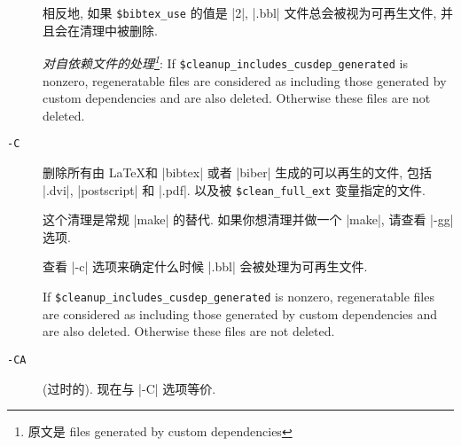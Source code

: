 \documentclass{ctexart}
\begin{document}
\begin{description}
        相反地, 如果 \verb|$bibtex_use| 的值是 |2|, |.bbl| 文件总会被视为可再生文件, 并且会在清理中被删除.

        \emph{对自依赖文件的处理\footnote{原文是 files generated by custom dependencies}}: If \verb|$cleanup_includes_cusdep_generated| is nonzero, regeneratable files are considered as including those generated by custom dependencies and are also deleted. Otherwise these files are not deleted.
        
        \item[\texttt{-C}] 删除所有由 \LaTeX 和 |bibtex| 或者 |biber| 生成的可以再生的文件, 包括 |.dvi|, |postscript| 和 |.pdf|. 以及被 \verb|$clean_full_ext| 变量指定的文件. 
        
        这个清理是常规 |make| 的替代. 如果你想清理并做一个 |make|, 请查看 |-gg| 选项.

        查看 |-c| 选项来确定什么时候 |.bbl| 会被处理为可再生文件. 

        If \verb|$cleanup_includes_cusdep_generated| is nonzero, regeneratable files are considered as including those generated by custom dependencies and are also deleted. Otherwise these files are not deleted.

        \item[\texttt{-CA}] (过时的). 现在与 |-C| 选项等价. 
    \end{description}
\end{document}
